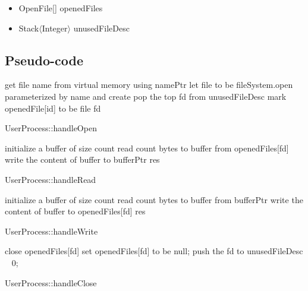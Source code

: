 \documentclass[a4paper,10pt]{article}
\begin{document}
\begin{itemize}
\item OpenFile[] openedFiles
\item Stack$\langle$Integer$\rangle$ unusedFileDesc
\end{itemize}

\subsection{Pseudo-code}

\begin{algorithm}
\DontPrintSemicolon
{}
get file name from virtual memory using namePtr\;
let file to be fileSystem.open parameterized by name and create\;
pop the top fd from unusedFileDesc\;
mark openedFile[id] to be file\;
\Return fd
\caption{UserProcess::handleOpen}
\label{algo:open}
\end{algorithm}

\begin{algorithm}
\DontPrintSemicolon
{}
initialize a buffer of size count\;
read count bytes to buffer from openedFiles[fd]\;
write the content of buffer to bufferPtr\;
\Return res
\caption{UserProcess::handleRead}
\label{algo:read}
\end{algorithm}

\begin{algorithm}
\DontPrintSemicolon
{}
initialize a buffer of size count\;
read count bytes to buffer from bufferPtr\;
write the content of buffer to openedFiles[fd]\;
\Return res
\caption{UserProcess::handleWrite}
\label{algo:write}
\end{algorithm}

\begin{algorithm}
\DontPrintSemicolon
{}
close openedFiles[fd]\;
set openedFiles[fd] to be null;
push the fd to unusedFileDesc\;
\Return~ 0;
\caption{UserProcess::handleClose}
\label{algo:close}
\end{algorithm}
\end{document}

